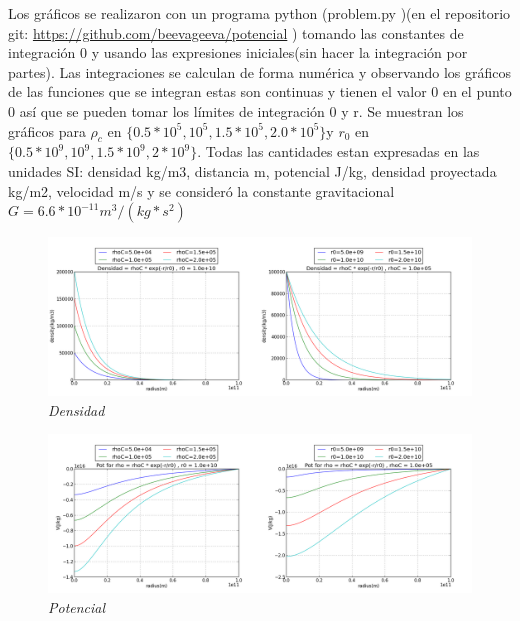 \documentclass[12pt]{book}
\begin{document}
\begin{description}
\item Los gráficos se realizaron con un programa python (problem.py )(en el repositorio git: \url{https://github.com/beevageeva/potencial} ) tomando las constantes de integración 0 y usando las expresiones iniciales(sin hacer la integración por partes). 
Las integraciones se calculan de forma numérica y observando los gráficos de las funciones que se integran estas son continuas y tienen el valor 0 en el punto 0 así que se pueden tomar los límites de integración 0 y r.
Se muestran los gráficos  para $\rho_c$ en $ \{0.5 * 10^5, 10^5, 1.5 * 10^5, 2.0 * 10^5 \} $y $r_0$ en $\{0.5 * 10^9, 10^9, 1.5 * 10^9 ,2 * 10^9 \}$. 
Todas las cantidades estan expresadas en las unidades SI: densidad kg/m3, distancia m, potencial J/kg, densidad proyectada kg/m2, velocidad m/s y se consideró la constante gravitacional $G = 6.6 * 10^{-11} m^3/(kg * s^2)$



\item

\begin{figure}[!ht]
 \centering
 \includegraphics[scale=0.33]{densFinal.png}
 \caption{\emph{Densidad}}
\end{figure}

\item

\begin{figure}[!ht]
 \centering
 \includegraphics[scale=0.33]{potFinal.png}
 \caption{\emph{Potencial}}
\end{figure}


\end{description}
\end{document}
